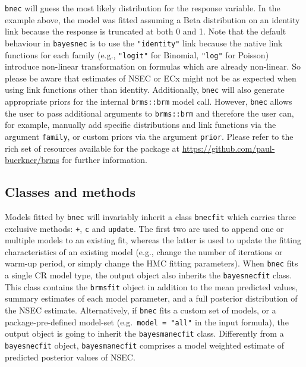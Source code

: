 \documentclass[
  shortnames]{jss}
\begin{document}
\texttt{bnec} will guess the most likely distribution for the response variable. In the example above, the model was fitted assuming a Beta distribution on an identity link because the response is truncated at both 0 and 1. Note that the default behaviour in \texttt{bayesnec} is to use the \texttt{"identity"} link because the native link functions for each family (e.g., \texttt{"logit"} for Binomial, \texttt{"log"} for Poisson) introduce non-linear transformation on formulas which are already non-linear. So please be aware that estimates of NSEC or ECx might not be as expected when using link functions other than identity. Additionally, \texttt{bnec} will also generate appropriate priors for the internal \texttt{brms::brm} model call. However, \texttt{bnec} allows the user to pass additional arguments to \texttt{brms::brm} and therefore the user can, for example, manually add specific distributions and link functions via the argument \texttt{family}, or custom priors via the argument \texttt{prior}. Please refer to the rich set of resources available for the  package at \url{https://github.com/paul-buerkner/brms} for further information.

\hypertarget{classes-and-methods}{%
\subsection{Classes and methods}\label{classes-and-methods}}

Models fitted by \texttt{bnec} will invariably inherit a class \texttt{bnecfit} which carries three exclusive methods: \texttt{+}, \texttt{c} and \texttt{update}. The first two are used to append one or multiple models to an existing fit, whereas the latter is used to update the fitting characteristics of an existing model (e.g., change the number of iterations or warm-up period, or simply change the HMC fitting parameters). When \texttt{bnec} fits a single CR model type, the output object also inherits the \texttt{bayesnecfit} class. This class contains the \texttt{brmsfit} object in addition to the mean predicted values, summary estimates of each model parameter, and a full posterior distribution of the NSEC estimate. Alternatively, if \texttt{bnec} fits a custom set of models, or a package-pre-defined model-set (e.g.~\texttt{model\ =\ "all"} in the input formula), the output object is going to inherit the \texttt{bayesmanecfit} class. Differently from a \texttt{bayesnecfit} object, \texttt{bayesmanecfit} comprises a model weighted estimate of predicted posterior values of NSEC.
\end{document}
